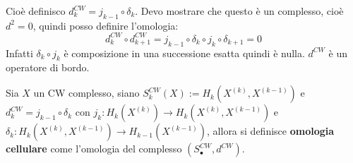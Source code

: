 Cioè definisco $ d_k^{CW} = j_{k-1} \circ \delta_k $. Devo mostrare che questo è un complesso, cioè $ d^2 = 0 $,
quindi posso definire l'omologia:
\[
   d_k^{CW} \circ  d_{k+1}^{CW} = j_{k-1} \circ \delta_k \circ j_k \circ \delta_{k+1} = 0
\]
Infatti $ \delta_k \circ j_k $ è composizione in una successione esatta quindi è nulla.
$ d^{CW} $ è un operatore di bordo.

\begin{definition}
  Sia $ X $ un CW complesso, siano $ S_k^{CW}(X) := H_k(X^{(k)}, X^{(k-1)}) $ e $ d_k^{CW} = j_{k-1} \circ \delta_k $
  con $ j_k \colon H_k(X^{(k)}) \to H_k(X^{(k)}, X^{(k-1)}) $ e $ \delta_k \colon H_k(X^{(k)}, X^{(k-1)}) \to  H_{k-1}(X^{(k-1)})  $,
  allora si definisce \textbf{omologia cellulare}
  come l'omologia del complesso $ (S_\bullet^{CW}, d^{CW}) $.
\end{definition}

